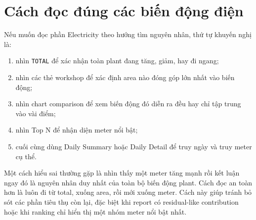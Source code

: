 \section{Cách đọc đúng các biến động điện}

Nếu muốn đọc phần Electricity theo hướng tìm nguyên nhân, thứ tự khuyến nghị là:

\begin{enumerate}[label=-]
\item nhìn \texttt{TOTAL} để xác nhận toàn plant đang tăng, giảm, hay đi ngang;
\item nhìn các thẻ workshop để xác định area nào đóng góp lớn nhất vào biến động;
\item nhìn chart comparison để xem biến động đó diễn ra đều hay chỉ tập trung vào vài điểm;
\item nhìn Top N để nhận diện meter nổi bật;
\item cuối cùng dùng Daily Summary hoặc Daily Detail để truy ngày và truy meter cụ thể.
\end{enumerate}

Một cách hiểu sai thường gặp là nhìn thấy một meter tăng mạnh rồi kết luận ngay đó là nguyên nhân duy nhất của toàn bộ biến động plant. Cách đọc an toàn hơn là luôn đi từ total, xuống area, rồi mới xuống meter. Cách này giúp tránh bỏ sót các phần tiêu thụ còn lại, đặc biệt khi report có residual-like contribution hoặc khi ranking chỉ hiển thị một nhóm meter nổi bật nhất.
